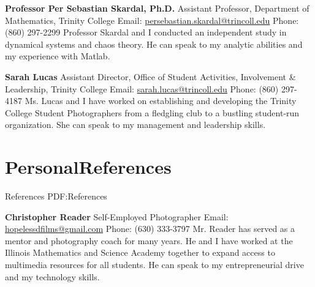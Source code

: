\documentclass[letterpaper,10pt,oneside]{article}
\newcommand{\CVNote}{Resume compiled on {\today}}
\begin{document}
\begin{body}
\BigGapNoBreak

{\textbf{Professor Per Sebastian Skardal, Ph.D.}}
\hfill
\GapNoBreak
\BulletItem
Assistant Professor, Department of Mathematics, Trinity College
\BulletItem
Email: \href{mailto:persebastian.skardal@trincoll.edu}{persebastian.skardal@trincoll.edu}
\BulletItem
Phone: (860) 297-2299
\BulletItem
Professor Skardal and I conducted an independent study in dynamical systems and chaos theory. He can speak to my analytic abilities and my experience with Matlab.

\BigGapNoBreak

{\textbf{Sarah Lucas}}
\hfill
\GapNoBreak
\BulletItem
Assistant Director, Office of Student Activities, Involvement \& Leadership, Trinity College
\BulletItem
Email: \href{mailto:sarah.lucas@trincoll.edu}{sarah.lucas@trincoll.edu}
\BulletItem
Phone: (860) 297-4187
\BulletItem
Ms. Lucas and I have worked on establishing and developing the Trinity College Student Photographers from a fledgling club to a bustling student-run organization. She can speak to my management and leadership skills.



\noindent\hrulefill
\section
{Personal\newline References}
{References}
{PDF:References}

{\textbf{Christopher Reader}}
\hfill
\GapNoBreak
\BulletItem
Self-Employed Photographer
\BulletItem
Email: \href{mailto:hopelessdfilms@gmail.com}{hopelessdfilms@gmail.com}
\BulletItem
Phone: (630) 333-3797
\BulletItem
Mr. Reader has served as a mentor and photography coach for many years. He and I have worked at the Illinois Mathematics and Science Academy together to expand access to multimedia resources for all students. He can speak to my entrepreneurial drive and my technology skills.

\end{body}


\begin{flushright}
\UseNoteFont
\hspace{2.0mm}\null
\end{flushright}
\end{document}
